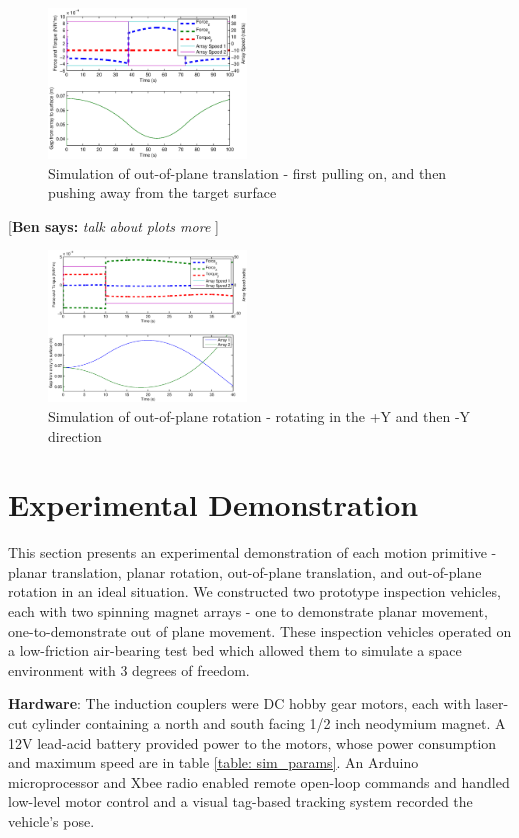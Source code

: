 \documentclass[letterpaper, 10 pt, conference]{ieeeconf}  %
\newcommand{\ben}[1]{{\color{red}\small\par {[{\bf Ben says:} {\em #1}} ] \\    }}
\begin{document}
     \begin{figure}[thpb]
      \centering
      \includegraphics[width = 0.47\textwidth]{figures/oop_translation_sim.eps}
      \caption{Simulation of out-of-plane translation - first pulling on, and then pushing away from the target surface}
      \label{fig:oop_translation_sim}
   \end{figure}
   \ben{talk about plots more}
   \begin{figure}[thpb]
      \centering
      \includegraphics[width = 0.47\textwidth]{figures/curve_rotations.eps}
      \caption{Simulation of out-of-plane rotation - rotating in the +Y and then -Y direction}
      \label{fig:oop_rotation_sim}
   \end{figure}

\section{Experimental Demonstration}\label{sec:experiments}
This section presents an experimental demonstration of each motion primitive - planar translation, planar rotation, out-of-plane translation, and out-of-plane rotation in an ideal situation. We constructed two prototype inspection vehicles, each with two spinning magnet arrays - one to demonstrate planar movement, one-to-demonstrate out of plane movement. These inspection vehicles operated on a low-friction air-bearing test bed which allowed them to simulate a space environment with 3 degrees of freedom. 

\par \textbf{Hardware}: The induction couplers were DC hobby gear motors, each with laser-cut cylinder containing a north and south facing 1/2 inch neodymium magnet. A 12V lead-acid battery provided power to the motors, whose power consumption and maximum speed are in table \ref{table: sim_params}. An Arduino microprocessor and Xbee radio enabled remote open-loop commands and handled low-level motor control and a visual tag-based tracking system recorded the vehicle's pose.  
\end{document}
